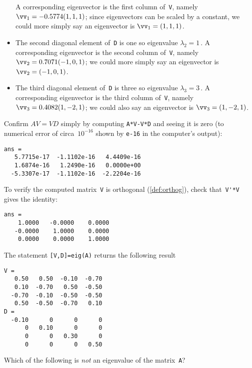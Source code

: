 \begin{example}
\begin{solution}
\begin{itemize}
A corresponding eigenvector is the first column of~\verb|V|, namely \(\vv_1=-0.5774(1,1,1)\);  since eigenvectors can be scaled by a constant, we could more simply say an eigenvector is \(\vv_1=(1,1,1)\).
\item The second diagonal element of~\verb|D| is one so eigenvalue \(\lambda_2=1\)\,.
A corresponding eigenvector is the second column of~\verb|V|, namely \(\vv_2=0.7071(-1,0,1)\);  we could more simply say an eigenvector is \(\vv_2=(-1,0,1)\).
\item The third diagonal element of~\verb|D| is three so eigenvalue \(\lambda_3=3\)\,.
A corresponding eigenvector is the third column of~\verb|V|, namely \(\vv_3=0.4082(1,-2,1)\);  we could also say an eigenvector is \(\vv_3=(1,-2,1)\).
\end{itemize}
Confirm \(AV=VD\) simply by computing \verb|A*V-V*D| and seeing it is zero (to numerical error of circa~\(10^{-16}\) shown by \verb|e-16| in the computer's output):
\begin{verbatim}
ans =
   5.7715e-17  -1.1102e-16   4.4409e-16
   1.6874e-16   1.2490e-16   0.0000e+00
  -5.3307e-17  -1.1102e-16  -2.2204e-16
\end{verbatim}
To verify the computed matrix~\verb|V| is orthogonal (\cref{def:orthog}), check that~\verb|V'*V| gives the identity:
\begin{verbatim}
ans =
    1.0000   -0.0000    0.0000
   -0.0000    1.0000    0.0000
    0.0000    0.0000    1.0000
\end{verbatim}
\end{solution}
\end{example}




\begin{activity}
The statement \verb|[V,D]=eig(A)| returns the following result \twodp
\begin{verbatim}
V =
   0.50   0.50  -0.10  -0.70
   0.10  -0.70   0.50  -0.50
  -0.70  -0.10  -0.50  -0.50
   0.50  -0.50  -0.70   0.10
D =
  -0.10      0      0      0
      0   0.10      0      0
      0      0   0.30      0
      0      0      0   0.50
\end{verbatim}
Which of the following is \emph{not} an eigenvalue of the matrix~\verb|A|?
\end{activity}






